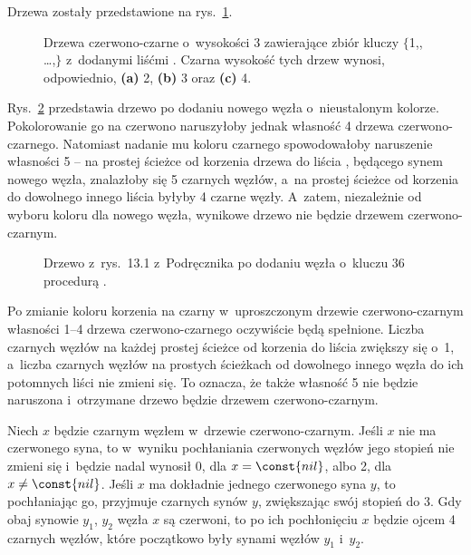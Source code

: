 
\exercise %
Drzewa zostały przedstawione na rys.\ \ref{fig:13.1-1}.
\begin{figure}[!ht]
	\centering 
	\caption{Drzewa czerwono-czarne o~wysokości 3 zawierające zbiór kluczy $\{$1,,\! \dots,$\}$ z~dodanymi liśćmi .
	Czarna wysokość tych drzew wynosi, odpowiednio, {\sffamily\bfseries(a)} 2, {\sffamily\bfseries(b)} 3 oraz {\sffamily\bfseries(c)} 4.} \label{fig:13.1-1}
\end{figure}

\exercise %
Rys.\ \ref{fig:13.1-2} przedstawia drzewo po dodaniu nowego węzła o~nieustalonym kolorze.
Pokolorowanie go na czerwono naruszyłoby jednak własność 4 drzewa czerwono-czarnego.
Natomiast nadanie mu koloru czarnego spowodowałoby naruszenie własności 5 -- na prostej ścieżce od korzenia drzewa do liścia , będącego synem nowego węzła, znalazłoby się 5 czarnych węzłów, a~na prostej ścieżce od korzenia do dowolnego innego liścia  byłyby 4 czarne węzły.
A~zatem, niezależnie od wyboru koloru dla nowego węzła, wynikowe drzewo nie będzie drzewem czerwono-czarnym.
\begin{figure}[!ht]
	\centering 
	\caption{Drzewo z~rys.\ 13.1 z~Podręcznika po dodaniu węzła o~kluczu 36 procedurą .} \label{fig:13.1-2}
\end{figure}

\exercise %
Po zmianie koloru korzenia na czarny w~uproszczonym drzewie czerwono-czarnym własności 1--4 drzewa czerwono-czarnego oczywiście będą spełnione.
Liczba czarnych węzłów na każdej prostej ścieżce od korzenia do liścia zwiększy się o~1, a~liczba czarnych węzłów na prostych ścieżkach od dowolnego innego węzła do ich potomnych liści nie zmieni się.
To oznacza, że także własność 5 nie będzie naruszona i~otrzymane drzewo będzie drzewem czerwono-czarnym.

\exercise %
Niech $x$ będzie czarnym węzłem w~drzewie czerwono-czarnym.
Jeśli $x$ nie ma czerwonego syna, to w~wyniku pochłaniania czerwonych węzłów jego stopień nie zmieni się i~będzie nadal wynosił 0, dla $x=\const{nil}$, albo 2, dla $x\ne\const{nil}$.
Jeśli $x$ ma dokładnie jednego czerwonego syna $y$, to pochłaniając go, przyjmuje czarnych synów $y$, zwiększając swój stopień do 3.
Gdy obaj synowie $y_1$, $y_2$ węzła $x$ są czerwoni, to po ich pochłonięciu $x$ będzie ojcem 4 czarnych węzłów, które początkowo były synami węzłów $y_1$ i~$y_2$.

